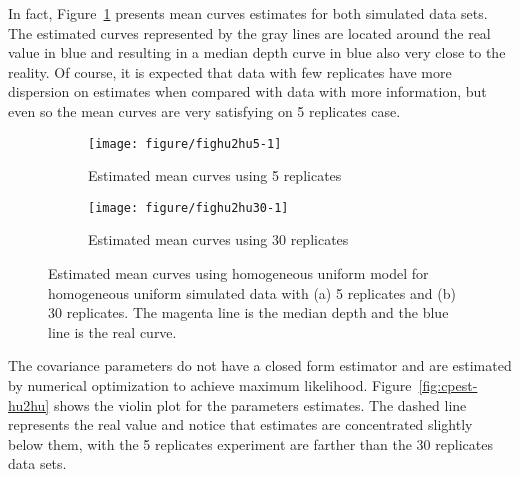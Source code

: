In fact, Figure~\ref{fig:mpchu2hu} presents mean curves estimates for both simulated data sets. The estimated curves represented by the gray lines are located around the real value in blue and resulting in a median depth curve in blue also very close to the reality. Of course, it is expected that data with few replicates have more dispersion on estimates when compared with data with more information, but even so the mean curves are very satisfying on 5 replicates case. %


\begin{figure}[!t]
  \begin{subfigure}{\textwidth}
    \centering
\begin{knitrout}
\color{fgcolor}
\texttt{[image: figure/fighu2hu5-1]} 

\end{knitrout}
    \caption{Estimated mean curves using 5 replicates}
  \end{subfigure}
    \begin{subfigure}{\textwidth}
      \centering
\begin{knitrout}
\color{fgcolor}
\texttt{[image: figure/fighu2hu30-1]} 

\end{knitrout}
    \caption{Estimated mean curves using 30 replicates}
  \end{subfigure}
  \caption[Mean curve estimation using homogeneous uniform model for homogeneous uniform simulated data]{Estimated mean curves using homogeneous uniform model for homogeneous uniform simulated data with (a) 5 replicates and (b) 30 replicates. The magenta line is the median depth and the blue line is the real curve.}
  \label{fig:mpchu2hu}
\end{figure}

The covariance parameters do not have a closed form estimator and are estimated by numerical optimization to achieve maximum likelihood. Figure~\ref{fig:cpest-hu2hu} shows the violin plot for the parameters estimates. The dashed line represents the real value and notice that estimates are concentrated slightly below them, with the 5 replicates experiment are farther than the 30 replicates data sets.




